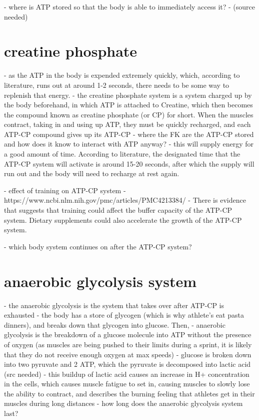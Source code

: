 \documentclass[index]{subfiles}
\begin{document}
- where is ATP stored so that the body is able to immediately access it?
- (source needed)
\section{creatine phosphate}
- as the ATP in the body is expended extremely quickly, which, according to literature, runs out at around 1-2 seconds, there needs to be some way to replenish that energy.
- the creatine phosphate system is a system charged up by the body beforehand, in which ATP is attached to Creatine, which then becomes the compound known as creatine phosphate (or CP) for short. When the muscles contract, taking in and using up ATP, they must be quickly recharged, and each ATP-CP compound gives up its ATP-CP
- where the FK are the ATP-CP stored and how does it know to interact with ATP anyway?
- this will supply energy for a good amount of time. According to literature, the designated time that the ATP-CP system will activate is around 15-20 seconds, after which the supply will run out and the body will need to recharge at rest again.

- effect of training on ATP-CP system
- https://www.ncbi.nlm.nih.gov/pmc/articles/PMC4213384/
- There is evidence that suggests that training could affect the buffer capacity of the ATP-CP system. Dietary supplements could also accelerate the growth of the ATP-CP system.

- which body system continues on after the ATP-CP system?

\section{anaerobic glycolysis system}
- the anaerobic glycolysis is the system that takes over after ATP-CP is exhausted
- the body has a store of glycogen (which is why athlete's eat pasta dinners), and breaks down that glycogen into glucose. Then,
- anaerobic glycolysis is the breakdown of a glucose molecule into ATP without the presence of oxygen (as muscles are being pushed to their limits during a sprint, it is likely that they do not receive enough oxygen at max speeds)
- glucose is broken down into two pyruvate and 2 ATP, which the pyruvate is decomposed into lactic acid (src needed)
- this buildup of lactic acid causes an increase in H+ concentration in the cells, which causes muscle fatigue to set in, causing muscles to slowly lose the ability to contract, and describes the burning feeling that athletes get in their muscles during long distances
- how long does the anaerobic glycolysis system last?
\end{document}
